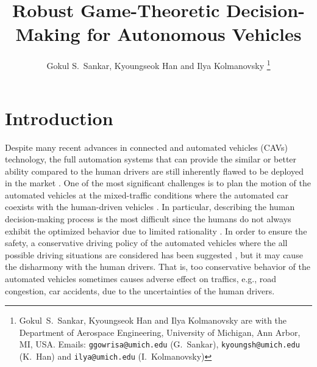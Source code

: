 \documentclass[10pt,journal]{IEEEtran}
\begin{document}
	
	\title{Robust Game-Theoretic Decision-Making for Autonomous Vehicles}
	
	\maketitle
	\thispagestyle{empty}

	\author{
		Gokul S.~Sankar,  Kyoungseok Han and Ilya Kolmanovsky%
		\thanks{Gokul~S.~Sankar,  Kyoungseok Han and Ilya Kolmanovsky are with the Department of Aerospace Engineering, University of Michigan, Ann Arbor, MI, USA. Emails: {\tt\small ggowrisa@umich.edu} (G.~Sankar), 
			{\tt\small kyoungsh@umich.edu} (K.~Han) and  {\tt\small ilya@umich.edu} (I.~Kolmanovsky) }%
	}
	
	
	
	\begin{abstract}
		
	\end{abstract}
	
	

	
	\section{Introduction}
	\label{sec:intro}

	Despite many recent advances in connected and automated vehicles (CAVs) technology, the full automation systems that can provide the similar or better ability compared to the human drivers are still inherently flawed to be deployed in the market \cite{Okuda2014}. One of the most significant challenges is to plan the motion of the automated vehicles at the mixed-traffic conditions where the automated car coexists with the human-driven vehicles \cite{Lazar2018}. In particular, describing the human decision-making process is the most difficult since the humans do not always exhibit the optimized behavior due to limited rationality \cite{Griffiths2015}. In order to ensure the safety, a conservative driving policy of the automated vehicles where the all possible driving situations are considered has been suggested \cite{Claussmann2015, Brechtel2014}, but it may cause the disharmony with the human drivers. That is, too conservative behavior of the automated vehicles sometimes causes adverse effect on traffics, e.g., road congestion, car accidents, due to the uncertainties of the human drivers.
	
\end{document}
